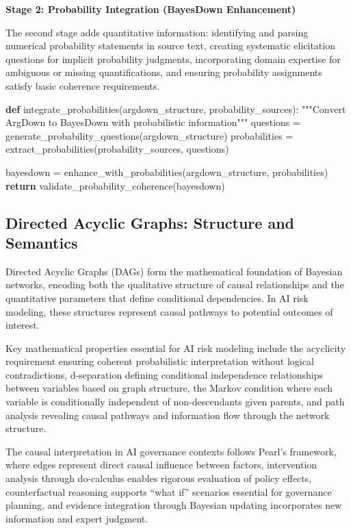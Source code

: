 \documentclass[
  11pt,
  letterpaper,
]{book}
\newenvironment{Shaded}{\begin{snugshade}}{\end{snugshade}}
\newcommand{\CommentTok}[1]{\textcolor[rgb]{0.37,0.37,0.37}{#1}}
\newcommand{\ControlFlowTok}[1]{\textcolor[rgb]{0.00,0.23,0.31}{\textbf{#1}}}
\newcommand{\KeywordTok}[1]{\textcolor[rgb]{0.00,0.23,0.31}{\textbf{#1}}}
\newcommand{\NormalTok}[1]{\textcolor[rgb]{0.00,0.23,0.31}{#1}}
\newcommand{\OperatorTok}[1]{\textcolor[rgb]{0.37,0.37,0.37}{#1}}
\begin{document}
\textbf{Stage 2: Probability Integration (BayesDown Enhancement)}

The second stage adds quantitative information: identifying and parsing
numerical probability statements in source text, creating systematic
elicitation questions for implicit probability judgments, incorporating
domain expertise for ambiguous or missing quantifications, and ensuring
probability assignments satisfy basic coherence requirements.

\begin{Shaded}
\begin{Highlighting}[]
\KeywordTok{def}\NormalTok{ integrate\_probabilities(argdown\_structure, probability\_sources):}
    \CommentTok{"""Convert ArgDown to BayesDown with probabilistic information"""}
\NormalTok{    questions }\OperatorTok{=}\NormalTok{ generate\_probability\_questions(argdown\_structure)}
\NormalTok{    probabilities }\OperatorTok{=}\NormalTok{ extract\_probabilities(probability\_sources, questions)}
    
\NormalTok{    bayesdown }\OperatorTok{=}\NormalTok{ enhance\_with\_probabilities(argdown\_structure, probabilities)}
    \ControlFlowTok{return}\NormalTok{ validate\_probability\_coherence(bayesdown)}
\end{Highlighting}
\end{Shaded}

\subsection{Directed Acyclic Graphs: Structure and
Semantics}\label{sec-dag-structure}

Directed Acyclic Graphs (DAGs) form the mathematical foundation of
Bayesian networks, encoding both the qualitative structure of causal
relationships and the quantitative parameters that define conditional
dependencies. In AI risk modeling, these structures represent causal
pathways to potential outcomes of interest.

Key mathematical properties essential for AI risk modeling include the
acyclicity requirement ensuring coherent probabilistic interpretation
without logical contradictions, d-separation defining conditional
independence relationships between variables based on graph structure,
the Markov condition where each variable is conditionally independent of
non-descendants given parents, and path analysis revealing causal
pathways and information flow through the network structure.

The causal interpretation in AI governance contexts follows Pearl's
framework, where edges represent direct causal influence between
factors, intervention analysis through do-calculus enables rigorous
evaluation of policy effects, counterfactual reasoning supports ``what
if'' scenarios essential for governance planning, and evidence
integration through Bayesian updating incorporates new information and
expert judgment.
\end{document}
